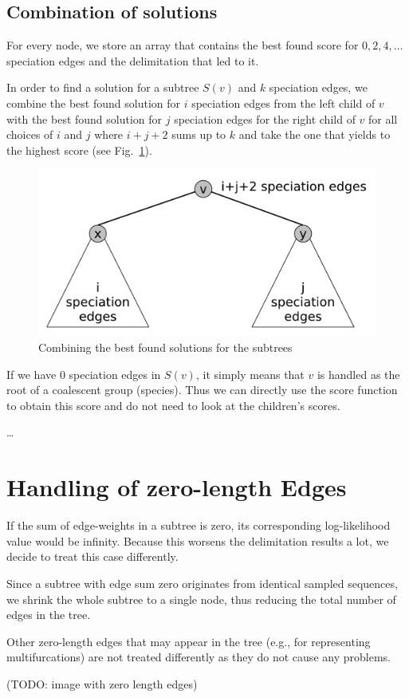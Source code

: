\documentclass{llncs}
\begin{document}
\subsection{Combination of solutions}

For every node, we store an array that contains the best found score for $0, 2, 4, \ldots$ speciation edges and the delimitation that led to it.

In order to find a solution for a subtree $S(v)$ and $k$ speciation edges, we combine the best found solution for $i$ speciation edges from the left child of $v$ with the best found solution for $j$ speciation edges for the right child of $v$ for all choices of $i$ and $j$ where $i+j+2$ sums up to $k$ and take the one that yields to the highest score (see Fig.~\ref{fig:combining}).

\begin{figure}[h!]
\centering
\includegraphics[scale=0.3]{images/speciation_events.pdf}
\caption{Combining the best found solutions for the subtrees}
\label{fig:combining}
\end{figure}



If we have $0$ speciation edges in $S(v)$, it simply means that $v$ is handled as the root of a coalescent group (species). Thus we can directly use the score function to obtain this score and do not need to look at the children's scores.

\ldots

\section{Handling of zero-length Edges}

If the sum of edge-weights in a subtree is zero, its corresponding log-likelihood value would be infinity. Because this worsens the delimitation results a lot, we decide to treat this case differently.

Since a subtree with edge sum zero originates from identical sampled sequences, we shrink the whole subtree to a single node, thus reducing the total number of edges in the tree.

Other zero-length edges that may appear in the tree (e.g., for representing multifurcations) are not treated differently as they do not cause any problems.

(TODO: image with zero length edges)



\end{document}
